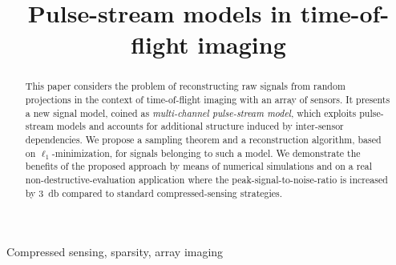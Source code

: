\documentclass{article}
\theoremstyle{definition}
\begin{document}
\ninept
%
\title{Pulse-stream models in time-of-flight imaging}
%
%

\maketitle

\begin{abstract}
	This paper considers the problem of reconstructing raw signals from random projections in the context of time-of-flight imaging with an array of sensors. It presents a new signal model, coined as \textit{multi-channel pulse-stream model}, which exploits pulse-stream models and accounts for additional structure induced by inter-sensor dependencies. We propose a sampling theorem and a reconstruction algorithm, based on $\ell_1$-minimization, for signals belonging to such a model. We demonstrate the benefits of the proposed approach by means of numerical simulations and on a real non-destructive-evaluation application where the peak-signal-to-noise-ratio is increased by \SI{3}{\decibel} compared to standard compressed-sensing strategies. 
\end{abstract}

\begin{keywords}%
Compressed sensing, sparsity, array imaging
\end{keywords}






%
\maketitle
\end{document}
